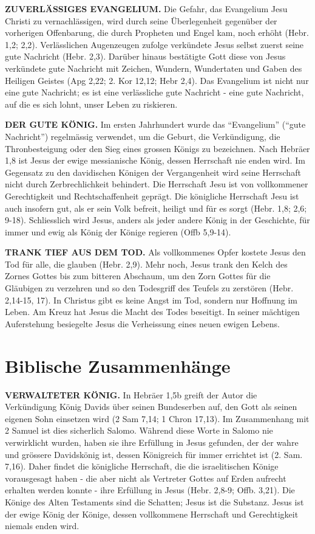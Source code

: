 \documentclass[
  12pt,
]{krantz}
\begin{document}
\textbf{ZUVERLÄSSIGES EVANGELIUM.} Die Gefahr, das Evangelium Jesu Christi zu vernachlässigen, wird durch seine Überlegenheit gegenüber der vorherigen Offenbarung, die durch Propheten und Engel kam, noch erhöht (Hebr. 1,2; 2,2). Verlässlichen Augenzeugen zufolge verkündete Jesus selbst zuerst seine gute Nachricht (Hebr. 2,3). Darüber hinaus bestätigte Gott diese von Jesus verkündete gute Nachricht mit Zeichen, Wundern, Wundertaten und Gaben des Heiligen Geistes (Apg 2,22; 2. Kor 12,12; Hebr 2,4). Das Evangelium ist nicht nur eine gute Nachricht; es ist eine verlässliche gute Nachricht - eine gute Nachricht, auf die es sich lohnt, unser Leben zu riskieren.

\textbf{DER GUTE KÖNIG.} Im ersten Jahrhundert wurde das ``Evangelium'' (``gute Nachricht'') regelmässig verwendet, um die Geburt, die Verkündigung, die Thronbesteigung oder den Sieg eines grossen Königs zu bezeichnen. Nach Hebräer 1,8 ist Jesus der ewige messianische König, dessen Herrschaft nie enden wird. Im Gegensatz zu den davidischen Königen der Vergangenheit wird seine Herrschaft nicht durch Zerbrechlichkeit behindert. Die Herrschaft Jesu ist von vollkommener Gerechtigkeit und Rechtschaffenheit geprägt. Die königliche Herrschaft Jesu ist auch insofern gut, als er sein Volk befreit, heiligt und für es sorgt (Hebr. 1,8; 2,6; 9-18). Schliesslich wird Jesus, anders als jeder andere König in der Geschichte, für immer und ewig als König der Könige regieren (Offb 5,9-14).

\textbf{TRANK TIEF AUS DEM TOD.} Als vollkommenes Opfer kostete Jesus den Tod für alle, die glauben (Hebr. 2,9). Mehr noch, Jesus trank den Kelch des Zornes Gottes bis zum bitteren Abschaum, um den Zorn Gottes für die Gläubigen zu verzehren und so den Todesgriff des Teufels zu zerstören (Hebr. 2,14-15, 17). In Christus gibt es keine Angst im Tod, sondern nur Hoffnung im Leben. Am Kreuz hat Jesus die Macht des Todes beseitigt. In seiner mächtigen Auferstehung besiegelte Jesus die Verheissung eines neuen ewigen Lebens.

\hypertarget{biblische-zusammenhuxe4nge}{%
\section{Biblische Zusammenhänge}\label{biblische-zusammenhuxe4nge}}

\textbf{VERWALTETER KÖNIG.} In Hebräer 1,5b greift der Autor die Verkündigung König Davids über seinen Bundeserben auf, den Gott als seinen eigenen Sohn einsetzen wird (2 Sam 7,14; 1 Chron 17,13). Im Zusammenhang mit 2 Samuel ist dies sicherlich Salomo. Während diese Worte in Salomo nie verwirklicht wurden, haben sie ihre Erfüllung in Jesus gefunden, der der wahre und grössere Davidskönig ist, dessen Königreich für immer errichtet ist (2. Sam. 7,16). Daher findet die königliche Herrschaft, die die israelitischen Könige vorausgesagt haben - die aber nicht als Vertreter Gottes auf Erden aufrecht erhalten werden konnte - ihre Erfüllung in Jesus (Hebr. 2,8-9; Offb. 3,21). Die Könige des Alten Testaments sind die Schatten; Jesus ist die Substanz. Jesus ist der ewige König der Könige, dessen vollkommene Herrschaft und Gerechtigkeit niemals enden wird.
\end{document}
